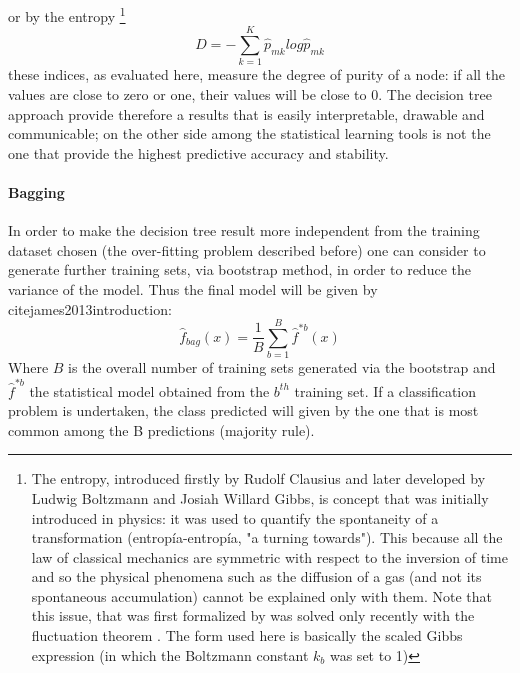 \documentclass[
12pt, %
a4paper, %
oneside, %
headinclude,footinclude, %
BCOR5mm, %
]{scrartcl}
\newcommand{\textgreek}[1]{\begingroup\fontencoding{LGR}\selectfont#1\endgroup}
\begin{document}
or by the entropy \footnote{The entropy, introduced firstly by Rudolf Clausius and later developed by  Ludwig Boltzmann and Josiah Willard Gibbs, is concept that was initially introduced in physics: it was used to quantify the spontaneity of a transformation (\textgreek{entropía}-entropía, "a turning towards"). This because all the law of classical mechanics are symmetric with respect to the inversion of time and so the physical phenomena such as the diffusion of a gas (and not its spontaneous accumulation) cannot be explained only with them. Note that this issue, that was first formalized by \cite{loschmidt1876grosse,wu1975boltzmann}  was solved only recently with the fluctuation theorem \cite{evans1993probability,wang2002experimental}. The form used here is basically the scaled Gibbs expression (in which the Boltzmann constant $k_{b}$ was set to 1)}
\begin{equation}
D=-\sum_{k=1}^{K}\hat{p}_{mk}log\hat{p}_{mk}
\end{equation}
these indices, as evaluated here, measure the degree of purity of a node: if all the values are close to zero or one, their values will be close to 0. The decision tree approach provide therefore a results that is easily interpretable, drawable and communicable; on the other side among the statistical learning tools is not the one that provide the highest predictive accuracy and stability. 


\paragraph{Bagging}

In order to make the decision tree result more independent from the training dataset chosen (the over-fitting problem described before) one can consider to generate further training sets, via bootstrap method, in order to reduce the variance of the model. Thus the final model will be given by \\cite{james2013introduction}: 
\begin{equation}
\hat{f}_{bag}\left(x\right)=\dfrac{1}{B}\sum_{b=1}^{B}\hat{f}^{*b}\left(x\right)
\end{equation}
Where $B$ is the overall number of training sets generated via the bootstrap and $\hat{f}^{*b}$ the statistical model obtained from the $b^{th}$ training set. If a classification problem is undertaken, the class predicted will given by the one that is most common among the B predictions (majority rule).
\end{document}
